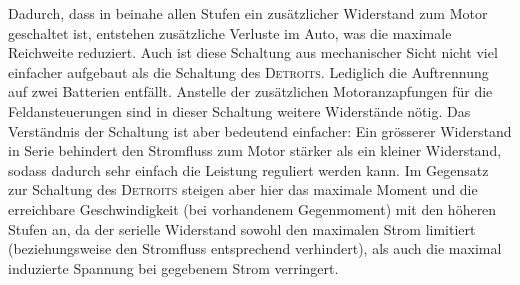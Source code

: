Dadurch, dass in beinahe allen Stufen ein zusätzlicher Widerstand zum Motor geschaltet ist, entstehen zusätzliche Verluste im Auto, was die maximale Reichweite reduziert. Auch ist diese Schaltung aus mechanischer Sicht nicht viel einfacher aufgebaut als die Schaltung des \textsc{Detroits}. Lediglich die Auftrennung auf zwei Batterien entfällt. Anstelle der zusätzlichen Motoranzapfungen für die Feldansteuerungen sind in dieser Schaltung weitere Widerstände nötig. Das Verständnis der Schaltung ist aber bedeutend einfacher: Ein grösserer Widerstand in Serie behindert den Stromfluss zum Motor stärker als ein kleiner Widerstand, sodass dadurch sehr einfach die Leistung reguliert werden kann. Im Gegensatz zur Schaltung des \textsc{Detroits} steigen aber hier das maximale Moment und die erreichbare Geschwindigkeit (bei vorhandenem Gegenmoment) mit den höheren Stufen an, da der serielle Widerstand sowohl den maximalen Strom limitiert (beziehungsweise den Stromfluss entsprechend verhindert), als auch die maximal induzierte Spannung bei gegebenem Strom verringert.